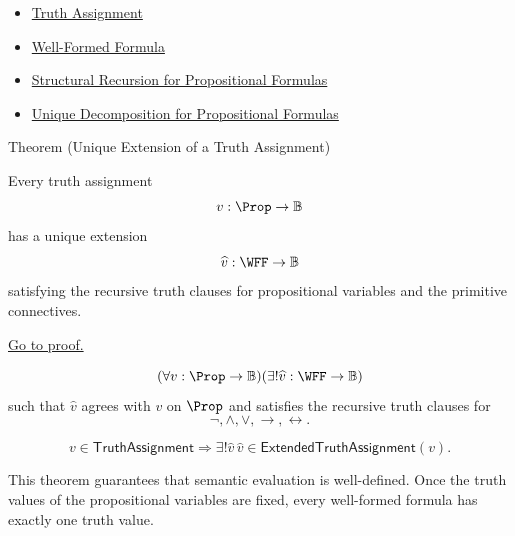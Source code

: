 \begin{dependencies}
\begin{itemize}
  \item \hyperref[def:truth-assignment-propositional-logic]{Truth Assignment}
  \item \hyperref[def:well-formed-formula]{Well-Formed Formula}
  \item \hyperref[thm:structural-recursion-propositional-formulas]{Structural Recursion for Propositional Formulas}
  \item \hyperref[thm:unique-decomposition-propositional-formulas]{Unique Decomposition for Propositional Formulas}
\end{itemize}
\end{dependencies}


\begin{theorembox}{Theorem (Unique Extension of a Truth Assignment)}
\begin{theorem}
\label{thm:unique-extension-truth-assignment-propositional-logic}
Every truth assignment
\[
v:\Prop\to\mathbb{B}
\]
has a unique extension
\[
\widehat v:\WFF\to\mathbb{B}
\]
satisfying the recursive truth clauses for propositional variables and the
primitive connectives.

\noindent\hyperref[prf:unique-extension-truth-assignment-propositional-logic]{Go to proof.}
\end{theorem}
\end{theorembox}

\begin{remark*}
\[
(\forall v:\Prop\to\mathbb{B})(\exists!\widehat v:\WFF\to\mathbb{B})
\]
such that \(\widehat v\) agrees with \(v\) on \(\Prop\) and satisfies the
recursive truth clauses for
\[
\neg,\land,\lor,\to,\leftrightarrow.
\]
\end{remark*}

\begin{remark*}
\[
v\in\mathsf{TruthAssignment}
\Longrightarrow
\exists!\widehat v\,
\widehat v\in\mathsf{ExtendedTruthAssignment}(v).
\]
\end{remark*}

\begin{remark*}[Interpretation]
This theorem guarantees that semantic evaluation is well-defined. Once the
truth values of the propositional variables are fixed, every well-formed formula
has exactly one truth value.
\end{remark*}

